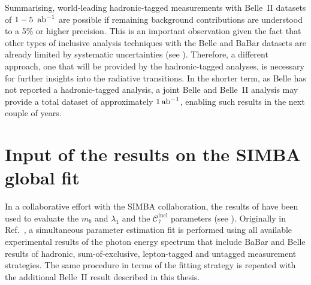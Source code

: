 Summarising, world-leading hadronic-tagged \BtoXsgamma measurements with Belle~II datasets of $1-5~\mbox{\,ab}^{-1}$ are possible if remaining background contributions are understood to a 5\% or higher precision.
This is an important observation given the fact that other types of inclusive \BtoXsgamma analysis techniques with the Belle and BaBar datasets are already limited by systematic uncertainties (see ).
Therefore, a different approach, one that will be provided by the hadronic-tagged analyses, is necessary for further insights into the radiative \BtoXsgamma transitions.
In the shorter term, as Belle has not reported a hadronic-tagged \BtoXsgamma analysis, a joint Belle and Belle~II analysis may provide a total dataset of approximately $1\mbox{\,ab}^{-1}$, enabling such results in the next couple of years.

\section{Input of the results on the SIMBA global fit}\label{sec:input_to_theory}

In a collaborative effort with the SIMBA collaboration, the results of 
have been used to evaluate the $m_b$ and $\lambda_1$ and the $\mathcal{C}_7^{\mathrm{incl}}$ parameters (see ). 
Originally in Ref.~\cite{Bernlochner:2020jlt}, a simultaneous parameter estimation fit is performed using all available experimental results of the photon energy spectrum that include
BaBar and Belle results of hadronic, sum-of-exclusive, lepton-tagged and untagged measurement strategies.
The same procedure in terms of the fitting strategy is repeated with the additional Belle~II result described in this thesis.

